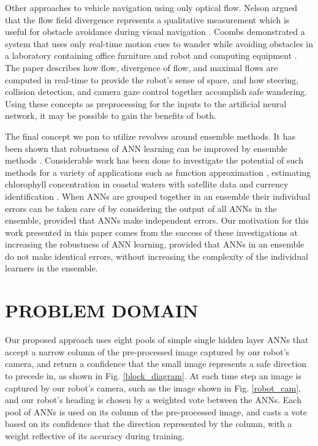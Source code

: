 \documentclass{article}
\begin{document}
	Other approaches to vehicle navigation using only optical flow.  Nelson argued that the flow field divergence represents a qualitative measurement which is useful for obstacle avoidance during visual navigation \cite{Nelson89ObstacleAvoidanceFlow}.  Coombs demonstrated a system that uses only real-time motion cues to wander while avoiding obstacles in a laboratory containing office furniture and robot and computing equipment \cite{Coombs98obstacleavoidanceflow}. The paper describes how flow, divergence of flow, and maximal flows are computed in real-time to provide the robot’s sense of space, and how steering, collision detection, and camera gaze control together accomplish safe wandering.  Using these concepts as preprocessing for the inputs to the artificial neural network, it may be possible to gain the benefits of both.

		The final concept we pan to utilize revolves around ensemble methods.  It has been shown that robustness of ANN learning can be improved by ensemble methods \cite{Hansen1990}.  Considerable work has been done to investigate the potential of such methods for a variety of applications such as function approximation \cite{Hansen1990}, estimating chlorophyll concentration in coastal waters with satellite data \cite{Slade03_enn_sat} and currency identification \cite{Debnath09_enn_money}.  When ANNs are grouped together in an ensemble their individual errors can be taken care of by considering the output of all ANNs in the ensemble, provided that ANNs make independent errors.  Our motivation for this work presented in this paper comes from the success of these investigations at increasing the robustness of ANN learning, provided that ANNs in an ensemble do not make identical errors, without increasing the complexity of the individual learners in the ensemble.

	\section{PROBLEM DOMAIN}

		Our proposed approach uses eight pools of simple single hidden layer ANNs that accept a narrow column of the pre-processed image captured by our robot's camera, and return a confidence that the small image represents a safe direction to precede in, as shown in Fig. \ref{block_diagram}.  At each time step an image is captured by our robot's camera, such as the image shown in Fig. \ref{robot_cam}, and our robot's heading is chosen by a weighted vote between the ANNs.  Each pool of ANNs is used on its column of the pre-processed image, and casts a vote based on its confidence that the direction represented by the column, with a weight reflective of its accuracy during training.
\end{document}
